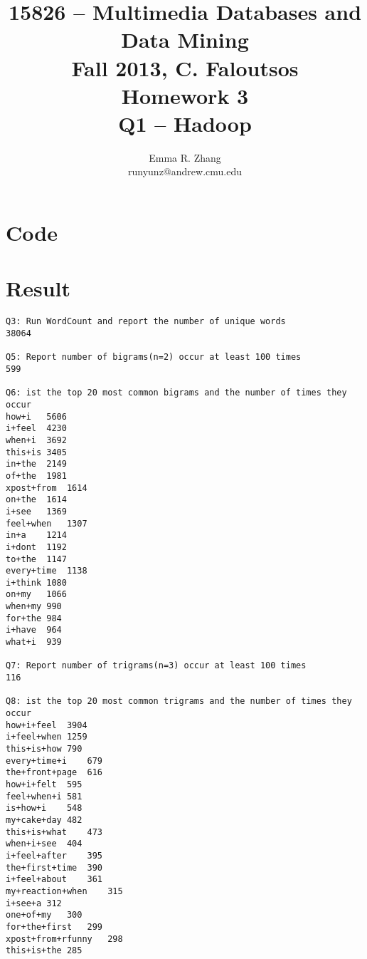 \documentclass[11pt]{article} %
\title{15826 – Multimedia Databases and Data Mining \\
	Fall 2013, C. Faloutsos \\
	Homework 3 \\
	Q1 – Hadoop}
\author{Emma R. Zhang \\
runyunz@andrew.cmu.edu}
\begin{document}
\maketitle

\section{Code}


\section{Result}
\begin{verbatim}
Q3: Run WordCount and report the number of unique words
38064

Q5: Report number of bigrams(n=2) occur at least 100 times
599

Q6: ist the top 20 most common bigrams and the number of times they occur
how+i	5606
i+feel	4230
when+i	3692
this+is	3405
in+the	2149
of+the	1981
xpost+from	1614
on+the	1614
i+see	1369
feel+when	1307
in+a	1214
i+dont	1192
to+the	1147
every+time	1138
i+think	1080
on+my	1066
when+my	990
for+the	984
i+have	964
what+i	939

Q7: Report number of trigrams(n=3) occur at least 100 times
116

Q8: ist the top 20 most common trigrams and the number of times they occur
how+i+feel	3904
i+feel+when	1259
this+is+how	790
every+time+i	679
the+front+page	616
how+i+felt	595
feel+when+i	581
is+how+i	548
my+cake+day	482
this+is+what	473
when+i+see	404
i+feel+after	395
the+first+time	390
i+feel+about	361
my+reaction+when	315
i+see+a	312
one+of+my	300
for+the+first	299
xpost+from+rfunny	298
this+is+the	285
\end{verbatim}
\end{document}
